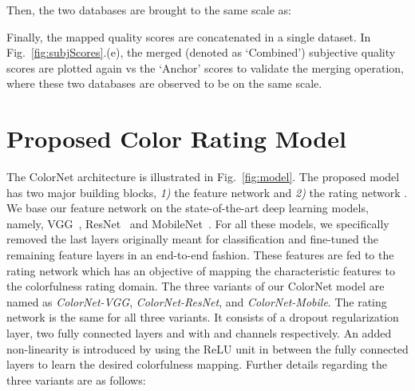 \documentclass{article}
\begin{document}
Then, the two databases are brought to the same scale as:

Finally, the mapped quality scores are concatenated in a single dataset. In Fig.~\ref{fig:subjScores}.(e), the merged (denoted as `Combined') subjective quality scores are plotted again vs the `Anchor' scores to validate the merging operation, where these two databases are observed to be on the same scale.%
 

\section{Proposed Color Rating Model}
\label{sec:model}
The ColorNet architecture is illustrated in Fig.~\ref{fig:model}. The proposed model has two major building blocks, \textit{1)} the feature network  and \textit{2)} the rating network . We base our feature network  on the state-of-the-art deep learning models, namely, VGG~\cite{Simonyan15}, ResNet~\cite{He2016DeepRL} and MobileNet~\cite{MobileNetsEC}. For all these models, we specifically removed the last layers originally meant for classification and fine-tuned the remaining feature layers in an end-to-end fashion. These features are fed to the rating network  which has an objective of mapping the characteristic features to the colorfulness rating domain. The three variants of our ColorNet model are named as \textit{ColorNet-VGG}, \textit{ColorNet-ResNet}, and \textit{ColorNet-Mobile}. 
The rating network is the same for all three variants. It consists of a dropout regularization layer, two fully connected layers  and  with  and  channels respectively. An added non-linearity is introduced by using the ReLU unit in between the fully connected layers to learn the desired colorfulness mapping. Further details regarding the three variants are as follows:
\end{document}
